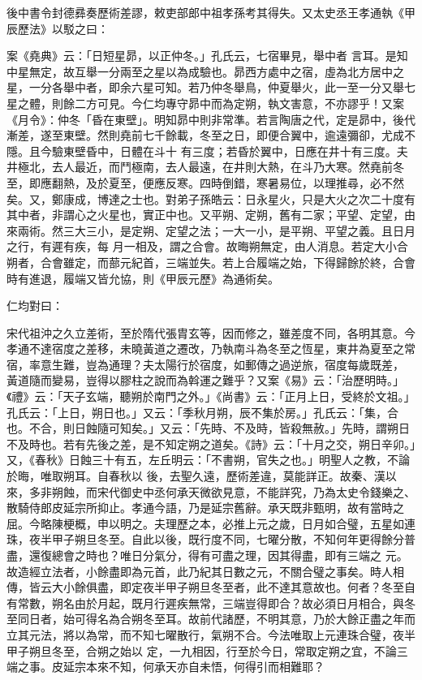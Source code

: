 \begin{pinyinscope}
 後中書令封德彞奏歷術差謬，敕吏部郎中祖孝孫考其得失。又太史丞王孝通執《甲辰歷法》以駁之曰：



 案《堯典》云：「日短星昴，以正仲冬。」孔氏云，七宿畢見，舉中者
 言耳。是知中星無定，故互舉一分兩至之星以為成驗也。昴西方處中之宿，虛為北方居中之星，一分各舉中者，即余六星可知。若乃仲冬舉鳥，仲夏舉火，此一至一分又舉七星之體，則餘二方可見。今仁均專守昴中而為定朔，執文害意，不亦謬乎！又案《月令》：仲冬「昏在東壁」。明知昴中則非常準。若言陶唐之代，定是昴中，後代漸差，遂至東壁。然則堯前七千餘載，冬至之日，即便合翼中，逾遠彌卻，尤成不隱。且今驗東壁昏中，日體在斗十
 有三度；若昏於翼中，日應在井十有三度。夫井極北，去人最近，而鬥極南，去人最遠，在井則大熱，在斗乃大寒。然堯前冬至，即應翻熱，及於夏至，便應反寒。四時倒錯，寒暑易位，以理推尋，必不然矣。又，鄭康成，博達之士也。對弟子孫皓云：日永星火，只是大火之次二十度有其中者，非謂心之火星也，實正中也。又平朔、定朔，舊有二家；平望、定望，由來兩術。然三大三小，是定朔、定望之法；一大一小，是平朔、平望之義。且日月之行，有遲有疾，每
 月一相及，謂之合會。故晦朔無定，由人消息。若定大小合朔者，合會雖定，而蔀元紀首，三端並失。若上合履端之始，下得歸餘於終，合會時有進退，履端又皆允協，則《甲辰元歷》為通術矣。



 仁均對曰：



 宋代祖沖之久立差術，至於隋代張胄玄等，因而修之，雖差度不同，各明其意。今孝通不達宿度之差移，未曉黃道之遷改，乃執南斗為冬至之恆星，東井為夏至之常宿，率意生難，豈為通理？夫太陽行於宿度，如郵傳之過逆旅，宿度每歲既差，
 黃道隨而變易，豈得以膠柱之說而為斡運之難乎？又案《易》云：「治歷明時。」《禮》云：「天子玄端，聽朔於南門之外。」《尚書》云：「正月上日，受終於文祖。」孔氏云：「上日，朔日也。」又云：「季秋月朔，辰不集於房。」孔氏云：「集，合也。不合，則日蝕隨可知矣。」又云：「先時、不及時，皆殺無赦。」先時，謂朔日不及時也。若有先後之差，是不知定朔之道矣。《詩》云：「十月之交，朔日辛卯。」又，《春秋》日蝕三十有五，左丘明云：「不書朔，官失之也。」明聖人之教，不論於晦，唯取朔耳。自春秋以
 後，去聖久遠，歷術差違，莫能詳正。故秦、漢以來，多非朔蝕，而宋代御史中丞何承天微欲見意，不能詳究，乃為太史令錢樂之、散騎侍郎皮延宗所抑止。孝通今語，乃是延宗舊辭。承天既非甄明，故有當時之屈。今略陳梗概，申以明之。夫理歷之本，必推上元之歲，日月如合璧，五星如連珠，夜半甲子朔旦冬至。自此以後，既行度不同，七曜分散，不知何年更得餘分普盡，還復總會之時也？唯日分氣分，得有可盡之理，因其得盡，即有三端之
 元。故造經立法者，小餘盡即為元首，此乃紀其日數之元，不關合璧之事矣。時人相傳，皆云大小餘俱盡，即定夜半甲子朔旦冬至者，此不達其意故也。何者？冬至自有常數，朔名由於月起，既月行遲疾無常，三端豈得即合？故必須日月相合，與冬至同日者，始可得名為合朔冬至耳。故前代諸歷，不明其意，乃於大餘正盡之年而立其元法，將以為常，而不知七曜散行，氣朔不合。今法唯取上元連珠合璧，夜半甲子朔旦冬至，合朔之始以
 定，一九相因，行至於今日，常取定朔之宜，不論三端之事。皮延宗本來不知，何承天亦自未悟，何得引而相難耶？




\end{pinyinscope}
